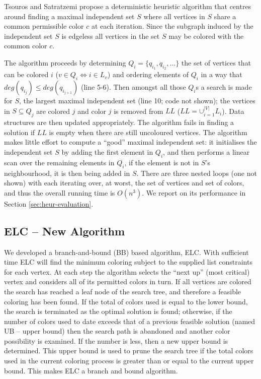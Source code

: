 \documentclass[10pt]{article}
\begin{document}
Tsouros and Satratzemi \cite{tsouros-satratzemi-05} propose a deterministic 
heuristic algorithm that centres around finding a maximal
independent set $S$ where all vertices in $S$ share a common permissible color 
$c$ at each iteration.  Since the subgraph induced by the independent set $S$ is 
edgeless all vertices in the set $S$ may be colored with the common color $c$.

The algorithm proceeds by determining $Q_i = \{q_{i_1}, q_{i_2}, ...\}$ the set of vertices that can
be colored $i$ ($v \in Q_i \Leftrightarrow i \in L_v$) and ordering elements of $Q_i$
in a way that $deg(q_{i_j}) \leq deg(q_{i_{j+1}})$ (line 5-6).  Then amongst
all those $Q_i$s a search is made for $S$, the largest maximal
independent set (line 10; code not shown); the vertices in $S \subseteq
Q_j$ are colored $j$ and color $j$ is removed from $LL$ ($LL =
\cup{}_{i=1}^{|V|}L_i$).  Data structures are then updated appropriately.
The algorithm fails in finding a solution if $LL$ is empty when there
are still uncoloured vertices. The algorithm makes little effort to
compute a ``good'' maximal independent set: it initialises the independent set $S$ by 
adding the first element in $Q_i$, and then performs a linear scan over the remaining 
elements in $Q_i$,  if the element is not in $S$'s neighbourhood, it is then being added in $S$.  
There are three nested loops (one not shown) with each iterating over, at worst, the 
set of vertices and set of colors, and thus the overall running time is $O(n^3)$.
We report on its performance in Section \ref{sec:heur-evaluation}.

\subsection{ELC -- New Algorithm}\label{sec:aelc}

We developed a branch-and-bound (BB) based algorithm, ELC.  With sufficient time ELC will find the minimum
coloring subject to the supplied list constraints for each vertex.  At each step the algorithm
selects the ``next up'' (most critical) vertex and considers all of its
permitted colors in turn. If all vertices are colored the
search has reached a leaf node of the search tree, and therefore a feasible coloring has been found. If the total
of colors used is equal to the lower bound, the search is terminated as the optimal solution is found;
otherwise, if the number of colors used to date exceeds that of a
previous feasible solution (named UB -- upper bound) then the search path is
abandoned and another color possibility is examined.  If the number is
less, then a new upper bound is determined.  This upper bound is used to
prune the search tree if the total colors used in the current coloring
process is greater than or equal to the current upper bound.  This makes
ELC a branch and bound algorithm.
\end{document}
